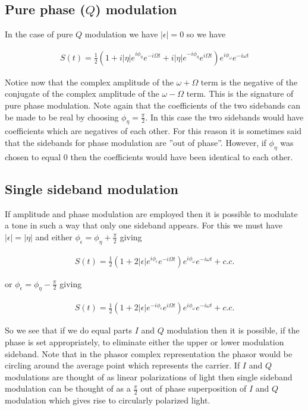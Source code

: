 \documentclass[12pt]{article}
\newcommand{\ep}{\epsilon}
\begin{document}
\subsection{Pure phase ($Q$) modulation}
In the case of pure $Q$ modulation we have $|\ep| = 0$ so we have

\begin{align}
S(t) = \frac{1}{2}\left(1 + i|\eta|e^{i\phi_{\eta}}e^{-i\Omega t} + i|\eta|e^{-i\phi_{\eta}}e^{i\Omega t} \right)e^{i\phi_{\omega}}e^{-i\omega t}
\end{align}

Notice now that the complex amplitude of the $\omega + \Omega$ term is the negative of the conjugate of the complex amplitude of the $\omega - \Omega$ term. This is the signature of pure phase modulation. Note again that the coefficients of the two sidebands can be made to be real by choosing $\phi_{\eta} = \frac{\pi}{2}$. In this case the two sidebands would have coefficients which are negatives of each other. For this reason it is sometimes said that the sidebands for phase modulation are ''out of phase''. However, if $\phi_{\eta}$ was chosen to equal $0$ then the coefficients would have been identical to each other.

\subsection{Single sideband modulation}
If amplitude and phase modulation are employed then it is possible to modulate a tone in such a way that only one sideband appears. For this we must have $|\ep| = |\eta|$ and either $\phi_{\ep} = \phi_{\eta} + \frac{\pi}{2}$ giving

\begin{align}
S(t) = \frac{1}{2}\left(1 + 2 |\ep|e^{i\phi_{\ep}} e^{-i\Omega t} \right)e^{i\phi_{\omega}}e^{-i\omega t} + c.c.
\end{align}

 or $\phi_{\ep} = \phi_{\eta} - \frac{\pi}{2}$ giving
 
 \begin{align}
 S(t) = \frac{1}{2}\left(1 + 2|\ep|e^{-i\phi_{\ep}}e^{i\Omega t}\right)e^{i\phi_{\omega}}e^{-i\omega t} + c.c.
 \end{align}
 
So we see that if we do equal parts $I$ and $Q$ modulation then it is possible, if the phase is set appropriately, to eliminate either the upper or lower modulation sideband. Note that in the phasor complex representation the phasor would be circling around the average point which represents the carrier. If $I$ and $Q$ modulations are thought of as linear polarizations of light then single sideband modulation can be thought of as a $\frac{\pi}{2}$ out of phase superposition of $I$ and $Q$ modulation which gives rise to circularly polarized light. 
\end{document}
